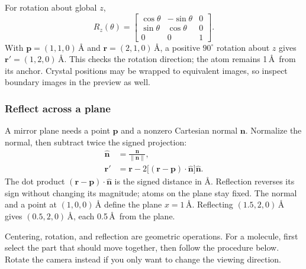 For rotation about global $z$,
\[
 R_z(\theta)=\begin{bmatrix}
 \cos\theta&-\sin\theta&0\\
 \sin\theta&\cos\theta&0\\
 0&0&1
 \end{bmatrix}.
\]
With $\mathbf p=(1,1,0)\,\text{\AA}$ and $\mathbf r=(2,1,0)\,\text{\AA}$, a positive $90^\circ$ rotation about $z$ gives $\mathbf r'=(1,2,0)\,\text{\AA}$. This checks the rotation direction; the atom remains 1\,\AA\ from its anchor. Crystal positions may be wrapped to equivalent images, so inspect boundary images in the preview as well.

\subsubsection{Reflect across a plane}

A mirror plane needs a point $\mathbf p$ and a nonzero Cartesian normal $\mathbf n$. Normalize the normal, then subtract twice the signed projection:
\begin{equation}
 \begin{aligned}
 \hat{\mathbf n}&=\frac{\mathbf n}{\|\mathbf n\|},\\
 \mathbf r'&=\mathbf r-
 2\bigl[(\mathbf r-\mathbf p)\cdot\hat{\mathbf n}\bigr]
       \hat{\mathbf n}.
 \end{aligned}
 \label{eq:mirror-cartesian-plane}
\end{equation}
The dot product $(\mathbf r-\mathbf p)\cdot\hat{\mathbf n}$ is the signed distance in \AA. Reflection reverses its sign without changing its magnitude; atoms on the plane stay fixed. The normal  and a point at $(1,0,0)\,\text{\AA}$ define the plane $x=1\,\text{\AA}$. Reflecting $(1.5,2,0)\,\text{\AA}$ gives $(0.5,2,0)\,\text{\AA}$, each 0.5\,\AA\ from the plane.



Centering, rotation, and reflection are geometric operations. For a molecule, first select the part that should move together, then follow the procedure below. Rotate the camera instead if you only want to change the viewing direction.
